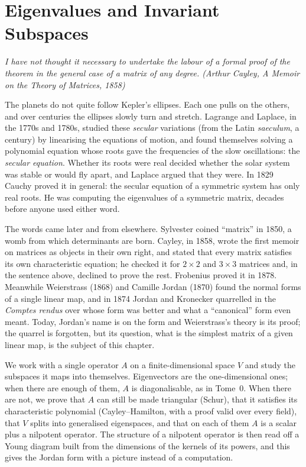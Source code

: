 \chapter{Eigenvalues and Invariant Subspaces}\label{ch:eigen}

\begin{center}\itshape
I have not thought it necessary to undertake the labour of a formal proof of the theorem in the general case of a
matrix of any degree.
\upshape(Arthur Cayley, \emph{A Memoir on the Theory of Matrices}, 1858)
\end{center}

The planets do not quite follow Kepler's ellipses. Each one pulls on the others, and over centuries the ellipses
slowly turn and stretch. Lagrange and Laplace, in the 1770s and 1780s, studied these \emph{secular} variations (from
the Latin \emph{saeculum}, a century) by linearising the equations of motion, and found themselves solving a polynomial
equation whose roots gave the frequencies of the slow oscillations: the \emph{secular equation}. Whether its roots
were real decided whether the solar system was stable or would fly apart, and Laplace argued that they were. In 1829
Cauchy proved it in general: the secular equation of a symmetric system has only real roots. He was computing the
eigenvalues of a symmetric matrix, decades before anyone used either word.

The words came later and from elsewhere. Sylvester coined ``matrix'' in 1850, a womb from which determinants are born.
Cayley, in 1858, wrote the first memoir on matrices as objects in their own right, and stated that every matrix
satisfies its own characteristic equation; he checked it for $2\times2$ and $3\times3$ matrices and, in the sentence
above, declined to prove the rest. Frobenius proved it in 1878. Meanwhile Weierstrass (1868) and Camille Jordan (1870)
found the normal forms of a single linear map, and in 1874 Jordan and Kronecker quarrelled in the \emph{Comptes rendus}
over whose form was better and what a ``canonical'' form even meant. Today, Jordan's name is on the form and
Weierstrass's theory is its proof; the quarrel is forgotten, but its question, what is the simplest matrix of a given
linear map, is the subject of this chapter.

We work with a single operator $A$ on a finite-dimensional space $V$ and study the subspaces it maps into themselves.
Eigenvectors are the one-dimensional ones; when there are enough of them, $A$ is diagonalisable, as in Tome~0. When
there are not, we prove that $A$ can still be made triangular (Schur), that it satisfies its characteristic polynomial
(Cayley--Hamilton, with a proof valid over every field), that $V$ splits into generalised eigenspaces, and that on each of
them $A$ is a scalar plus a nilpotent operator. The structure of a nilpotent operator is then read off a Young diagram
built from the dimensions of the kernels of its powers, and this gives the Jordan form with a picture instead of a
computation.

